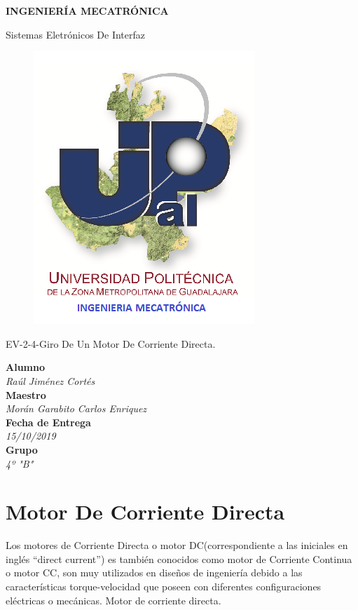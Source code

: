 \documentclass[10pt,a4paper]{article}
\author{Jiménez Cortés Raúl}
\begin{document}
\begin{center}
\begin{LARGE}
\textbf{INGENIERÍA MECATRÓNICA}\\
\end{LARGE}
{\large Sistemas Eletrónicos De Interfaz}\\
\begin{figure}[hbtp]
\centering
\includegraphics[scale=0.80]{UPZMG_Mecatr_nica.png}
\end{figure} 
\begin{center}
\begin{LARGE}
EV-2-4-Giro De Un Motor De Corriente Directa.
\end{LARGE}
\end{center}

\begin{Large}
\textbf{Alumno}
\\\textit{Raúl Jiménez Cortés}
\textbf{\\Maestro}
\\\textit{Morán Garabito Carlos Enriquez}
\textbf{\\Fecha de Entrega}
\\\textit{15/10/2019}
\textbf{\\Grupo}
\\\textit{4º "B"}
\end{Large}
\end{center}

\newpage
\section{Motor De Corriente Directa}
Los motores de Corriente Directa o motor DC(correspondiente a las iniciales en inglés “direct current”) es también conocidos como motor de Corriente Continua o motor CC, son  muy utilizados en diseños de ingeniería debido a las características torque-velocidad que poseen con diferentes configuraciones eléctricas o mecánicas.
Motor de corriente directa.
\end{document}
